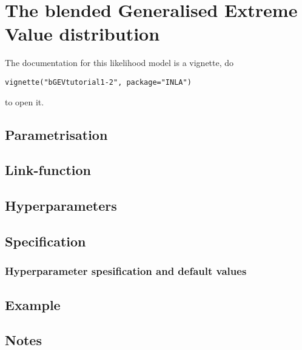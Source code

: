 \documentclass[a4paper,11pt]{article}
\begin{document}
\section*{The blended Generalised Extreme Value distribution}

The documentation for this likelihood model is a vignette, do

\texttt{vignette("bGEVtutorial1-2", package="INLA")}

\noindent to open it. 

\subsection*{Parametrisation}

\subsection*{Link-function}


\subsection*{Hyperparameters}

\subsection*{Specification}


\subsubsection*{Hyperparameter spesification and default values}


\subsection*{Example}

\subsection*{Notes}
\end{document}
